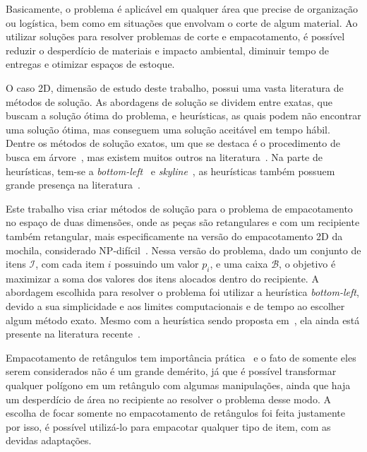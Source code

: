 Basicamente, o problema é aplicável em qualquer área que precise de organização ou logística,
bem como em situações que envolvam o corte de algum material.
Ao utilizar soluções para resolver problemas de corte e empacotamento, é possível reduzir o
desperdício de materiais e impacto ambiental, diminuir tempo de entregas e otimizar espaços
de estoque.

O caso 2D, dimensão de estudo deste trabalho, possui uma vasta literatura de métodos de solução.
As abordagens de solução se dividem entre exatas, que buscam a solução ótima do problema, e
heurísticas, as quais podem não encontrar uma solução ótima, mas conseguem uma solução aceitável em
tempo hábil.
Dentre os métodos de solução exatos, um que se destaca é o procedimento de busca em árvore~\cite{
    beasley1985exact}, mas existem muitos outros na literatura~\cite{exact-solution-techniques,
    fekete1997new,delorme2016bin,kenmochi2009exact}.
Na parte de heurísticas, tem-se a \textit{bottom-left}~\cite{baker1980orthogonal,chehrazad2022fast}
e \textit{skyline}~\cite{wei2011skyline}, as heurísticas também possuem grande presença na
literatura~\cite{burke2004new,rakotonirainy2020improved,hopper2001empirical,chen2019efficient,
    huang2007efficient,hopper2001review}.

Este trabalho visa criar métodos de solução para o problema de empacotamento no espaço de duas
dimensões, onde as peças
são retangulares e com um recipiente também retangular, mais especificamente na versão do
empacotamento 2D da mochila, considerado NP-difícil~\cite{2DPackLib}.
Nessa versão do problema, dado um conjunto de itens $\mathcal{I}$, com cada item $i$ possuindo um
valor $p_i$, e uma caixa $\mathcal{B}$, o objetivo é maximizar a soma dos valores dos itens alocados
dentro do recipiente.
A abordagem escolhida para resolver o problema foi utilizar a heurística \textit{bottom-left},
devido a sua simplicidade e aos limites computacionais e de tempo ao escolher algum método exato.
Mesmo com a heurística sendo proposta em~\citeyear*{baker1980orthogonal}, ela ainda está presente
na literatura recente~\cite{chehrazad2022fast,hopper2001empirical,wei2011skyline}.

Empacotamento de retângulos tem importância prática~\cite{firat2020effective} e o fato de somente
eles serem considerados não é um grande demérito, já que é possível transformar qualquer polígono
em um retângulo com algumas manipulações, ainda que haja um desperdício de área no recipiente ao
resolver o problema desse modo.
A escolha de focar somente no empacotamento de retângulos foi feita justamente por isso, é possível
utilizá-lo para empacotar qualquer tipo de item, com as devidas adaptações.

